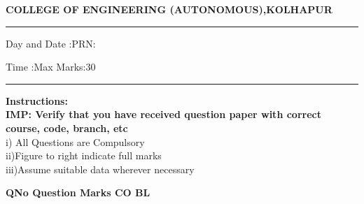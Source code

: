 \documentclass[12pt]{article}
\begin{document}
	\par
	{\bf{COLLEGE OF ENGINEERING (AUTONOMOUS),KOLHAPUR}}
	\par\noindent\rule{\textwidth}{0.4pt}
	
	\par
	\par
	\par
\begin{flushleft}
	Day and Date :{}\hspace{5.5cm}PRN:
\end{flushleft}

\begin{flushleft}
	Time :{}\hspace{7cm}Max Marks:{30}\\
\end{flushleft}
\noindent\rule{\textwidth}{0.1pt}
\begin{flushleft}
	{\bf Instructions:}\\
	{\hspace{0.5cm} \bf IMP: Verify that you have received question paper with correct course, code, branch, etc}\\
	\hspace{1cm}i) All Questions are Compulsory\\
	\hspace{1cm}ii)Figure to right indicate full marks\\
	\hspace{1cm}iii)Assume suitable data wherever necessary\\
\end{flushleft} 

	\begin{flushleft}
	\bf{QNo}\hspace{1.2cm} \bf{Question} \hspace{5.5cm}  \bf{Marks} \hspace{0.2cm} \bf{CO} \hspace{0.2cm}	\bf{BL}	
	
	
	
	
	
	
\end{flushleft}

		

	
	
\end{document}
